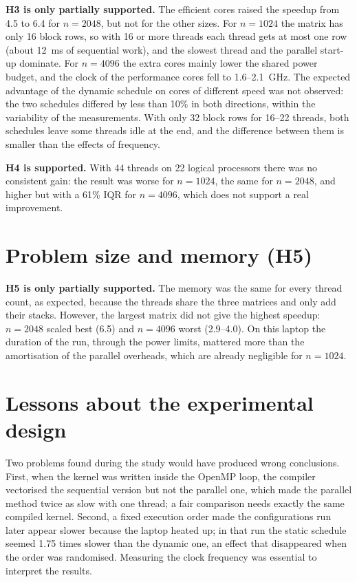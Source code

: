 \documentclass[12pt,a4paper]{report}
\begin{document}
\textbf{H3 is only partially supported.} The efficient cores raised the speedup from 4.5 to 6.4 for $n = 2048$, but
not for the other sizes. For $n = 1024$ the matrix has only 16 block rows, so with 16 or more threads each thread gets
at most one row (about 12~ms of sequential work), and the slowest thread and the parallel start-up dominate. For $n = 4096$ the
extra cores mainly lower the shared power budget, and the clock of the performance cores fell to 1.6--2.1~GHz. The
expected advantage of the dynamic schedule on cores of different speed was not observed: the two schedules differed by
less than 10\% in both directions, within the variability of the measurements. With only 32 block rows for 16--22
threads, both schedules leave some threads idle at the end, and the difference between them is smaller than the
effects of frequency.

\textbf{H4 is supported.} With 44 threads on 22 logical processors there was no consistent gain: the result was worse
for $n = 1024$, the same for $n = 2048$, and higher but with a 61\% IQR for $n = 4096$, which does not support a real
improvement.

\section{Problem size and memory (H5)}

\textbf{H5 is only partially supported.} The memory was the same for every thread count, as expected, because the
threads share the three matrices and only add their stacks. However, the largest matrix did not give the highest
speedup: $n = 2048$ scaled best (6.5) and $n = 4096$ worst (2.9--4.0). On this laptop the duration of the run, through
the power limits, mattered more than the amortisation of the parallel overheads, which are already negligible for
$n = 1024$.

\section{Lessons about the experimental design}

Two problems found during the study would have produced wrong conclusions. First, when the kernel was written inside
the OpenMP loop, the compiler vectorised the sequential version but not the parallel one, which made the parallel
method twice as slow with one thread; a fair comparison needs exactly the same compiled kernel. Second, a fixed
execution order made the configurations run later appear slower because the laptop heated up; in that run the static
schedule seemed 1.75 times slower than the dynamic one, an effect that disappeared when the order was randomised.
Measuring the clock frequency was essential to interpret the results.
\end{document}
